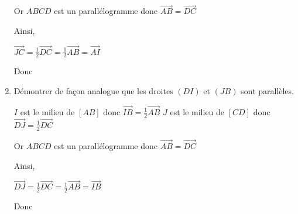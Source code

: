 \begin{enumerate}
Or $ABCD$ est un parallélogramme donc $\overrightarrow{AB}=\overrightarrow{DC}$

Ainsi,

$\overrightarrow{JC}=\frac{1}{2}\overrightarrow{DC}=\frac{1}{2}\overrightarrow{AB}=\overrightarrow{AI}$

Donc 

\item Démontrer de façon analogue que les droites $(DI)$ et $(JB)$ sont parallèles.

$I$ est le milieu de $[AB]$ donc $\overrightarrow{IB}=\frac{1}{2}\overrightarrow{AB}$
$J$ est le milieu de $[CD]$ donc $\overrightarrow{DJ}=\frac{1}{2}\overrightarrow{DC}$

Or $ABCD$ est un parallélogramme donc $\overrightarrow{AB}=\overrightarrow{DC}$

Ainsi,

$\overrightarrow{DJ}=\frac{1}{2}\overrightarrow{DC}=\frac{1}{2}\overrightarrow{AB}=\overrightarrow{IB}$

Donc 




\end{enumerate}